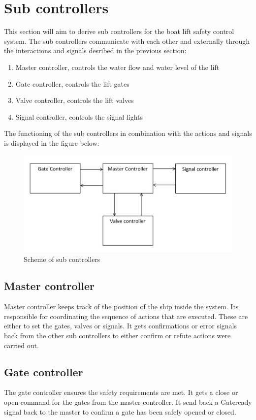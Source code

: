 \section{Sub controllers}
This section will aim to derive sub controllers for the boat lift safety control system. The sub controllers communicate with each other and externally through the interactions and signals desribed in the previous section:

\begin{enumerate}
	\item Master controller, controls the water flow and water level of the lift
	\item Gate controller, controls the lift gates
	\item Valve controller, controls the lift valves
	\item Signal controller, controls the signal lights
\end{enumerate}

The functioning of the sub controllers in combination with the actions and signals is displayed in the figure below:
	
\begin{figure}[!h]
	\includegraphics[width=\linewidth]{controllers}
	\caption{Scheme of sub controllers}
	\label{fig:subcontrollers}
\end{figure}
\subsection{Master controller}
Master controller keeps track of the position of the ship inside the system. Its responsible for coordinating the sequence of actions that are executed. These are either to set the gates, valves or signals. It gets confirmations or error signals back from the other sub controllers to either confirm or refute actions were carried out. 
\subsection{Gate controller}
The gate controller ensures the safety requirements are met. It gets a close or open command for the gates from the master controller. It send back a Gateready signal back to the master to confirm a gate has been safely opened or closed. 

